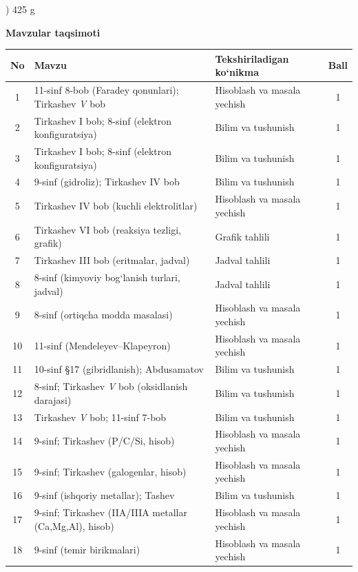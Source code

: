\documentclass[11pt,a4paper]{article}
\begin{document}
) 425 g\par
\par\bigskip\noindent\textbf{Mavzular taqsimoti}\par\smallskip
{\small\noindent\begin{longtable}{|c|p{7.2cm}|p{5.4cm}|c|}\hline \textbf{No} & \textbf{Mavzu} & \textbf{Tekshiriladigan ko`nikma} & \textbf{Ball}\\\hline
1 & 11-sinf 8-bob (Faradey qonunlari); Tirkashev \textit{V} bob & Hisoblash va masala yechish & 1\\\hline
2 & Tirkashev I bob; 8-sinf (elektron konfiguratsiya) & Bilim va tushunish & 1\\\hline
3 & Tirkashev I bob; 8-sinf (elektron konfiguratsiya) & Bilim va tushunish & 1\\\hline
4 & 9-sinf (gidroliz); Tirkashev IV bob & Bilim va tushunish & 1\\\hline
5 & Tirkashev IV bob (kuchli elektrolitlar) & Hisoblash va masala yechish & 1\\\hline
6 & Tirkashev VI bob (reaksiya tezligi, grafik) & Grafik tahlili & 1\\\hline
7 & Tirkashev III bob (eritmalar, jadval) & Jadval tahlili & 1\\\hline
8 & 8-sinf (kimyoviy bog`lanish turlari, jadval) & Jadval tahlili & 1\\\hline
9 & 8-sinf (ortiqcha modda masalasi) & Hisoblash va masala yechish & 1\\\hline
10 & 11-sinf (Mendeleyev--Klapeyron) & Hisoblash va masala yechish & 1\\\hline
11 & 10-sinf \S{}17 (gibridlanish); Abdusamatov & Bilim va tushunish & 1\\\hline
12 & 8-sinf; Tirkashev \textit{V} bob (oksidlanish darajasi) & Bilim va tushunish & 1\\\hline
13 & Tirkashev \textit{V} bob; 11-sinf 7-bob & Bilim va tushunish & 1\\\hline
14 & 9-sinf; Tirkashev (P/C/Si, hisob) & Hisoblash va masala yechish & 1\\\hline
15 & 9-sinf; Tirkashev (galogenlar, hisob) & Hisoblash va masala yechish & 1\\\hline
16 & 9-sinf (ishqoriy metallar); Tashev & Bilim va tushunish & 1\\\hline
17 & 9-sinf; Tirkashev (IIA/IIIA metallar (Ca,Mg,Al), hisob) & Hisoblash va masala yechish & 1\\\hline
18 & 9-sinf (temir birikmalari) & Hisoblash va masala yechish & 1\\\hline

\end{longtable}}
\end{document}
